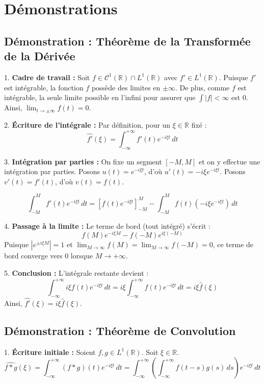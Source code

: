 \documentclass[11pt,a4paper]{article}
\begin{document}
\section{Démonstrations}

\subsection{Démonstration : Théorème de la Transformée de la Dérivée}

1. \textbf{Cadre de travail :}
   Soit $f \in \mathcal{C}^1(\mathbb{R}) \cap L^1(\mathbb{R})$ avec $f' \in L^1(\mathbb{R})$.
   Puisque $f'$ est intégrable, la fonction $f$ possède des limites en $\pm\infty$.
   De plus, comme $f$ est intégrable, la seule limite possible en l'infini pour assurer que $\int |f| < \infty$ est $0$. Ainsi, $\lim_{t \to \pm\infty} f(t) = 0$.

2. \textbf{Écriture de l'intégrale :}
   Par définition, pour un $\xi \in \mathbb{R}$ fixé :
   $$ \widehat{f'}(\xi) = \int_{-\infty}^{+\infty} f'(t) e^{-i\xi t} \, dt $$

3. \textbf{Intégration par parties :}
   On fixe un segment $[-M, M]$ et on y effectue une intégration par parties.
   Posons $u(t) = e^{-i\xi t}$, d'où $u'(t) = -i\xi e^{-i\xi t}$.
   Posons $v'(t) = f'(t)$, d'où $v(t) = f(t)$.

   $$ \int_{-M}^{M} f'(t) e^{-i\xi t} \, dt = \left[ f(t) e^{-i\xi t} \right]_{-M}^{M} - \int_{-M}^{M} f(t) (-i\xi e^{-i\xi t}) \, dt $$

4. \textbf{Passage à la limite :}
   Le terme de bord (tout intégré) s'écrit :
   $$ f(M)e^{-i\xi M} - f(-M)e^{i\xi (-M)} $$
   Puisque $|e^{\pm i\xi M}| = 1$ et $\lim_{M \to \infty} f(M) = \lim_{M \to \infty} f(-M) = 0$, ce terme de bord converge vers $0$ lorsque $M \to +\infty$.

5. \textbf{Conclusion :}
   L'intégrale restante devient :
   $$ \int_{-\infty}^{+\infty} i\xi f(t) e^{-i\xi t} \, dt = i\xi \int_{-\infty}^{+\infty} f(t) e^{-i\xi t} \, dt = i\xi \hat{f}(\xi) $$
   Ainsi, $\widehat{f'}(\xi) = i\xi \hat{f}(\xi)$.

\subsection{Démonstration : Théorème de Convolution}

1. \textbf{Écriture initiale :}
   Soient $f, g \in L^1(\mathbb{R})$. Soit $\xi \in \mathbb{R}$.
   $$ \widehat{f * g}(\xi) = \int_{-\infty}^{+\infty} (f * g)(t) e^{-i\xi t} \, dt = \int_{-\infty}^{+\infty} \left( \int_{-\infty}^{+\infty} f(t-s)g(s) \, ds \right) e^{-i\xi t} \, dt $$
\end{document}
